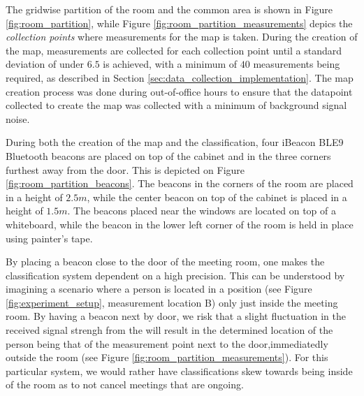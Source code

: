 The gridwise partition of the room and the common area is shown in Figure \ref{fig:room_partition}, while Figure \ref{fig:room_partition_measurements} depics the \textit{collection points} where measurements for the map is taken.
During the creation of the map, measurements are collected for each collection point until a standard deviation of under $6.5$  is achieved, with a minimum of $40$ measurements being required, as described in Section \ref{sec:data_collection_implementation}.
The map creation process was done during out-of-office hours to ensure that the datapoint collected to create the map was collected with a minimum of background signal noise.

During both the creation of the map and the classification, four iBeacon BLE9 Bluetooth beacons \cite{BluetoothiBeaconBLE9} are placed on top of the cabinet and in the three corners furthest away from the door. This is depicted on Figure \ref{fig:room_partition_beacons}.
The beacons in the corners of the room are placed in a height of $2.5m$, while the center beacon on top of the cabinet is placed in a height of $1.5m$.
The beacons placed near the windows are located on top of a whiteboard, while the beacon in the lower left corner of the room is held in place using painter's tape.

By placing a beacon close to the door of the meeting room, one makes the classification system dependent on a high precision.
This can be understood by imagining a scenario where a person is located in a position (see Figure \ref{fig:experiment_setup}, measurement location B) only just inside the meeting room.
By having a beacon next by door, we risk that a slight fluctuation in the received signal strengh from the will result in the determined location of the person being that of the measurement point next to the door,immediatedly outside the room (see Figure \ref{fig:room_partition_measurements}).
For this particular system, we would rather have classifications skew towards being inside of the room as to not cancel meetings that are ongoing.